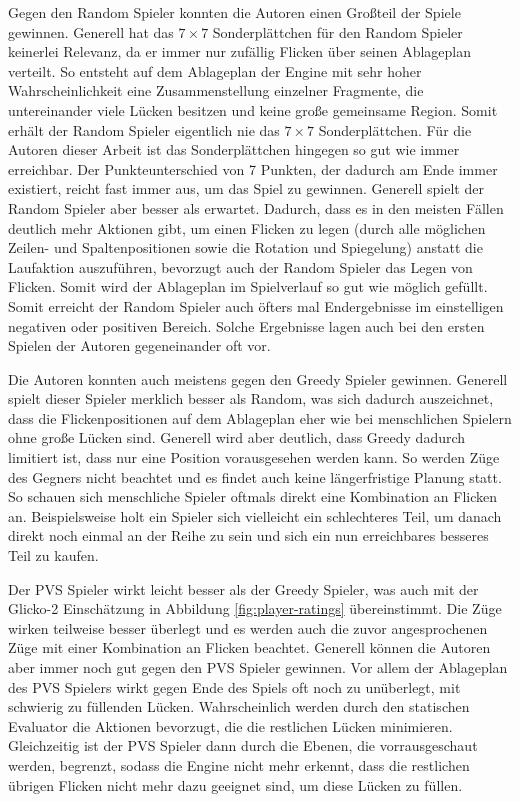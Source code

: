 Gegen den Random Spieler konnten die Autoren einen Großteil der Spiele gewinnen. Generell hat das $7\times 7$ Sonderplättchen für den Random Spieler keinerlei Relevanz, da er immer nur zufällig Flicken über seinen Ablageplan verteilt. So entsteht auf dem Ablageplan der Engine mit sehr hoher Wahrscheinlichkeit eine Zusammenstellung einzelner Fragmente, die untereinander viele Lücken besitzen und keine große gemeinsame Region. Somit erhält der Random Spieler eigentlich nie das $7\times 7$ Sonderplättchen. Für die Autoren dieser Arbeit ist das Sonderplättchen hingegen so gut wie immer erreichbar. Der Punkteunterschied von 7 Punkten, der dadurch am Ende immer existiert, reicht fast immer aus, um das Spiel zu gewinnen. Generell spielt der Random Spieler aber besser als erwartet. Dadurch, dass es in den meisten Fällen deutlich mehr Aktionen gibt, um einen Flicken zu legen (durch alle möglichen Zeilen- und Spaltenpositionen sowie die Rotation und Spiegelung) anstatt die Laufaktion auszuführen, bevorzugt auch der Random Spieler das Legen von Flicken. Somit wird der Ablageplan im Spielverlauf so gut wie möglich gefüllt. Somit erreicht der Random Spieler auch öfters mal Endergebnisse im einstelligen negativen oder positiven Bereich. Solche Ergebnisse lagen auch bei den ersten Spielen der Autoren gegeneinander oft vor.

Die Autoren konnten auch meistens gegen den Greedy Spieler gewinnen. Generell spielt dieser Spieler merklich besser als Random, was sich dadurch auszeichnet, dass die Flickenpositionen auf dem Ablageplan eher wie bei menschlichen Spielern ohne große Lücken sind. Generell wird aber deutlich, dass Greedy dadurch limitiert ist, dass nur eine Position vorausgesehen werden kann. So werden Züge des Gegners nicht beachtet und es findet auch keine längerfristige Planung statt. So schauen sich menschliche Spieler oftmals direkt eine Kombination an Flicken an. Beispielsweise holt ein Spieler sich vielleicht ein schlechteres Teil, um danach direkt noch einmal an der Reihe zu sein und sich ein nun erreichbares besseres Teil zu kaufen.

Der \ac{PVS} Spieler wirkt leicht besser als der Greedy Spieler, was auch mit der Glicko-2 Einschätzung in Abbildung \ref{fig:player-ratings} übereinstimmt. Die Züge wirken teilweise besser überlegt und es werden auch die zuvor angesprochenen Züge mit einer Kombination an Flicken beachtet. Generell können die Autoren aber immer noch gut gegen den \ac{PVS} Spieler gewinnen. Vor allem der Ablageplan des \ac{PVS} Spielers wirkt gegen Ende des Spiels oft noch zu unüberlegt, mit schwierig zu füllenden Lücken. Wahrscheinlich werden durch den statischen Evaluator die Aktionen bevorzugt, die die restlichen Lücken minimieren. Gleichzeitig ist der \ac{PVS} Spieler dann durch die Ebenen, die vorrausgeschaut werden, begrenzt, sodass die Engine nicht mehr erkennt, dass die restlichen übrigen Flicken nicht mehr dazu geeignet sind, um diese Lücken zu füllen.

